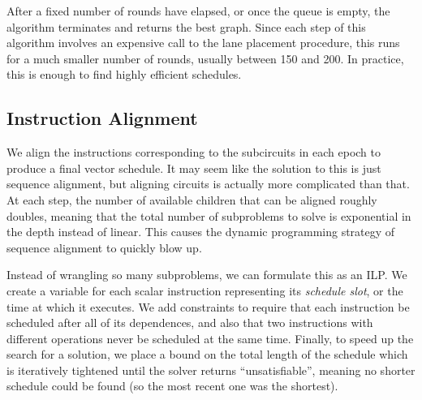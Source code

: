 After a fixed number of rounds have elapsed, or once the queue is empty, the algorithm terminates and returns the best graph.
Since each step of this algorithm involves an expensive call to the lane placement procedure, this runs for a much smaller number of rounds, usually between 150 and 200.
In practice, this is enough to find highly efficient schedules.

\subsection{Instruction Alignment}\label{sec:instruction-alignment}
We align the instructions corresponding to the subcircuits in each epoch to produce a final vector schedule.
It may seem like the solution to this is just sequence alignment, but aligning circuits is actually more complicated than that.
At each step, the number of available children that can be aligned roughly doubles, meaning that the total number of subproblems to solve is exponential in the depth instead of linear. 
This causes the dynamic programming strategy of sequence alignment to quickly blow up.

Instead of wrangling so many subproblems, we can formulate this as an ILP.
We create a variable for each scalar instruction representing its {\em schedule slot}, or the time at which it executes.
We add constraints to require that each instruction be scheduled after all of its dependences, and also that two instructions with different operations never be scheduled at the same time. 
Finally, to speed up the search for a solution, we place a bound on the total length of the schedule which is iteratively tightened until the solver returns ``unsatisfiable'', meaning no shorter schedule could be found (so the most recent one was the shortest).